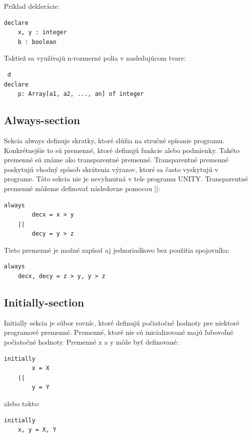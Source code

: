 \vspace{5mm}

Príklad deklerácie:
\begin{lstlisting}
declare 
	x, y : integer
	b : boolean
\end{lstlisting}

\vspace{5mm}

Taktiež sa využívajú n-rozmerné polia v nasledujúcom tvare:
\begin{lstlisting} d
declare 
	p: Array[a1, a2, ..., an] of integer
\end{lstlisting}

\subsection{Always-section}

Sekcia always definuje skratky, ktoré slúžia na stručné spísanie programu. 
Konkrétnejšie to sú premenné, ktoré definujú funkcie alebo podmienky. 
Takéto premenné sú známe ako transparentné premenné. 
Transparentné premenné poskytujú vhodný spôsob skrátenia výrazov, ktoré sa často vyskytujú v programe. 
Táto sekcia nie je nevyhnutná v tele programu UNITY. Transparentné premenné môžeme definovať následovne pomocou ||:

\begin{lstlisting}
always
		decx = x > y
	||
		decy = y > z
\end{lstlisting}

Tieto premenné je možné zapísať aj jednoriadkovo bez použitia spojovníka:

\begin{lstlisting}
always
	decx, decy = z > y, y > z
\end{lstlisting}

\subsection{Initially-section}

Initially sekcia je súbor rovníc, ktoré definujú počiatočné hodnoty pre niektoré programové premenné. 
Premenné, ktoré nie sú inicializované majú ľubovoľné počiatočné hodnoty. Premenné x a y môže byť definované:

\begin{lstlisting}
initially
		x = X
	||
		y = Y
\end{lstlisting}

alebo takto:

\begin{lstlisting}
initially
	x, y = X, Y
\end{lstlisting}
